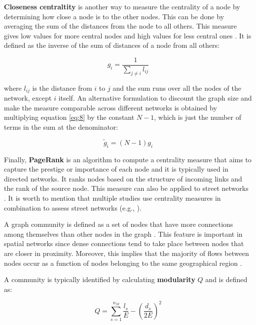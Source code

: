\textbf{Closeness centraltity} is another way to measure the centrality of a node by determining how close a node is to the other nodes. This can be done by averaging the sum of the distances from the node to all others. This measure gives low values for more central nodes and high values for less central ones \cite{newman_2010}. It is defined as the inverse of the sum of distances of a node from all others:

\begin{equation} \label{eq:8}
g_i = \frac{1}{\sum_{j \neq i} l_{ij}}
\end{equation}

where $l_{ij}$ is the distance from $i$ to $j$ and the sum runs over all the nodes of the network, except $i$ itself. An alternative formulation to discount the graph size and make the measure comparable across different networks is obtained by multiplying equation \ref{eq:8} by the constant $N - 1$, which is just the number of terms in the sum at the denominator:

\begin{equation} \label{eq:9}
\tilde{g}_i = (N - 1)g_i
\end{equation}

Finally, \textbf{PageRank} is an algorithm to compute a centrality measure that aims to capture the prestige or importance of each node and it is typically used in directed networks. It ranks nodes based on the structure of incoming links and the rank of the source node. This measure can also be applied to street networks \cite{jiang_2006, agryzkov_2012, gleich_2014, chin-wen_2015}. It is worth to mention that multiple studies use centrality measures in combination to assess street networks (e.g., \cite{porta_2004, porta_2006, porta_2010, crucitti_urban_2006, crucitti_spatial_2006, sevtsuk_2012}).

A graph community is defined as a set of nodes that have more connections among themselves than other nodes in the graph \cite{fortunato_2010}. This feature is important in spatial networks since dense connections tend to take place between nodes that are closer in proximity. Moreover, this implies that the majority of flows between nodes occur as a function of nodes belonging to the same geographical region \cite{barthelemy_2018}.

A community is typically identified by calculating \textbf{modularity} $Q$ \cite{newman-girvan_2004} and is defined as:

\begin{equation}
Q = \sum_{s = 1}^{n_M} \frac{l_s}{E} - (\frac{d_s}{2E})^2
\end{equation}


